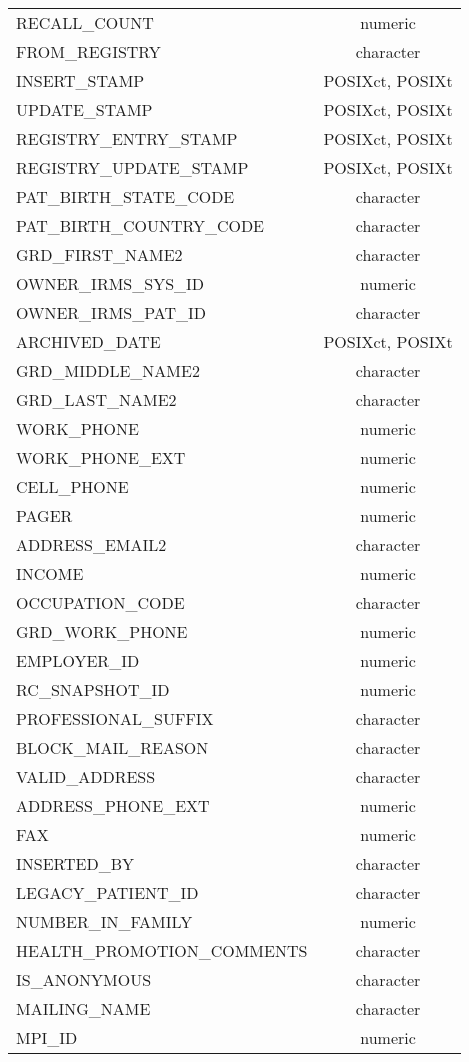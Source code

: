 \documentclass[
  letterpaper,
  DIV=11,
  numbers=noendperiod]{scrreprt}
\begin{document}
\begin{longtable}{lc}
RECALL\_COUNT & numeric \\ 
FROM\_REGISTRY & character \\ 
INSERT\_STAMP & POSIXct, POSIXt \\ 
UPDATE\_STAMP & POSIXct, POSIXt \\ 
REGISTRY\_ENTRY\_STAMP & POSIXct, POSIXt \\ 
REGISTRY\_UPDATE\_STAMP & POSIXct, POSIXt \\ 
PAT\_BIRTH\_STATE\_CODE & character \\ 
PAT\_BIRTH\_COUNTRY\_CODE & character \\ 
GRD\_FIRST\_NAME2 & character \\ 
OWNER\_IRMS\_SYS\_ID & numeric \\ 
OWNER\_IRMS\_PAT\_ID & character \\ 
ARCHIVED\_DATE & POSIXct, POSIXt \\ 
GRD\_MIDDLE\_NAME2 & character \\ 
GRD\_LAST\_NAME2 & character \\ 
WORK\_PHONE & numeric \\ 
WORK\_PHONE\_EXT & numeric \\ 
CELL\_PHONE & numeric \\ 
PAGER & numeric \\ 
ADDRESS\_EMAIL2 & character \\ 
INCOME & numeric \\ 
OCCUPATION\_CODE & character \\ 
GRD\_WORK\_PHONE & numeric \\ 
EMPLOYER\_ID & numeric \\ 
RC\_SNAPSHOT\_ID & numeric \\ 
PROFESSIONAL\_SUFFIX & character \\ 
BLOCK\_MAIL\_REASON & character \\ 
VALID\_ADDRESS & character \\ 
ADDRESS\_PHONE\_EXT & numeric \\ 
FAX & numeric \\ 
INSERTED\_BY & character \\ 
LEGACY\_PATIENT\_ID & character \\ 
NUMBER\_IN\_FAMILY & numeric \\ 
HEALTH\_PROMOTION\_COMMENTS & character \\ 
IS\_ANONYMOUS & character \\ 
MAILING\_NAME & character \\ 
MPI\_ID & numeric \\ 

\end{longtable}
\end{document}
